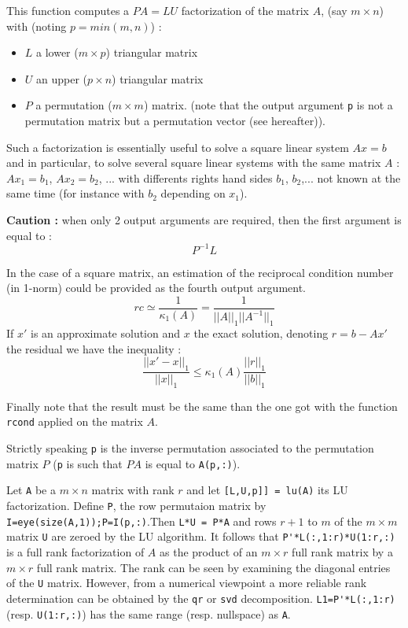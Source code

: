 \begin{mandescription}
This function computes a $P A = L U$ factorization of the matrix $A$, 
(say $m \times n$) with (noting $p = min(m,n)$) :
\begin{itemize}
\item $L$ a lower  ($m \times p$) triangular matrix
\item $U$ an upper  ($p \times n$) triangular matrix
\item $P$ a permutation  ($m \times m$) matrix.
      (note that the output argument \verb+p+ is not a permutation matrix
       but a permutation vector (see hereafter)). 
\end{itemize}
Such a factorization is essentially useful to solve a square linear
system $A x = b$ and in particular, to solve several square linear
systems with the same matrix $A$ : $Ax_1=b_1$, $Ax_2 = b_2$, ... with
differents rights hand sides $b_1$, $b_2$,... not known at the same
time (for instance with $b_2$ depending on $x_1$). 

{\bf Caution :} when only 2 output arguments are required, then the first argument is
equal to :
$$
P^{-1}L
$$



In the case of a square matrix, an estimation of the reciprocal
condition number (in 1-norm) could be provided as the fourth output argument.
$$
rc \simeq \frac{1}{\kappa_1(A)} = \frac{1}{||A||_1 ||A^{-1}||_1}
$$
If $x'$ is an approximate solution and $x$ the exact solution,
denoting $r = b - Ax'$ the residual we have the inequality :
$$
\frac{||x' - x||_1}{||x||_1} \le \kappa_1(A) \frac{||r||_1}{||b||_1}
$$
 
Finally note that the result must be the same than the one got 
with the function \verb+rcond+ applied on the matrix $A$.
 
Strictly speaking \verb+p+ is the inverse permutation associated
to the permutation matrix $P$ (\verb+p+ is such that $PA$ is equal 
to \verb+A(p,:)+).

Let \verb!A! be a $m \times n$ matrix with rank $r$ and let \verb![L,U,p]] = lu(A)! its LU factorization. 
Define \verb!P!, the row permutaion matrix by \verb!I=eye(size(A,1));P=I(p,:)!.Then \verb!L*U = P*A! and rows
$r+1$ to $m$ of the $m \times m$ matrix \verb!U! are zeroed by the LU algorithm. It follows that 
\verb!P'*L(:,1:r)*U(1:r,:)! is a full rank factorization of $A$ as the product of an $m \times r$ full
rank matrix by a $m \times r$ full rank matrix. The rank can be seen by examining the diagonal
entries of the \verb!U! matrix. However, from a numerical viewpoint a more reliable rank determination
can be obtained by the \verb!qr! or \verb!svd! decomposition.
\verb!L1=P'*L(:,1:r)! (resp. \verb!U(1:r,:)!) has the same range (resp. nullspace) as \verb!A!.
\end{mandescription}

